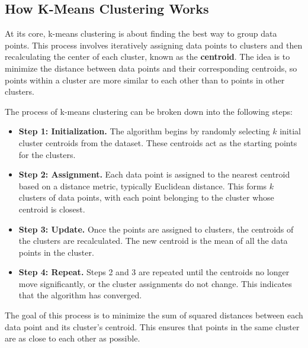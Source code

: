\subsection{How K-Means Clustering Works}
\begin{flushleft}
    \large At its core, k-means clustering is about finding the best way to group data points. This process involves iteratively assigning data points to clusters and then recalculating the center of each cluster, known as the \textbf{centroid}. The idea is to minimize the distance between data points and their corresponding centroids, so points within a cluster are more similar to each other than to points in other clusters.

    The process of k-means clustering can be broken down into the following steps:
    \begin{itemize}
        \item \textbf{Step 1: Initialization.} The algorithm begins by randomly selecting \( k \) initial cluster centroids from the dataset. These centroids act as the starting points for the clusters.
        
        \item \textbf{Step 2: Assignment.} Each data point is assigned to the nearest centroid based on a distance metric, typically Euclidean distance. This forms \( k \) clusters of data points, with each point belonging to the cluster whose centroid is closest.
        
        \item \textbf{Step 3: Update.} Once the points are assigned to clusters, the centroids of the clusters are recalculated. The new centroid is the mean of all the data points in the cluster.
        
        \item \textbf{Step 4: Repeat.} Steps 2 and 3 are repeated until the centroids no longer move significantly, or the cluster assignments do not change. This indicates that the algorithm has converged.
    \end{itemize}

    The goal of this process is to minimize the sum of squared distances between each data point and its cluster’s centroid. This ensures that points in the same cluster are as close to each other as possible.
\end{flushleft}

